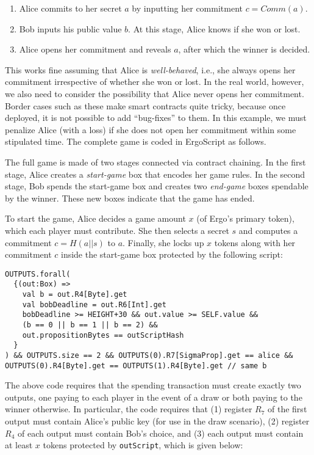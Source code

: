 \documentclass[runningheads]{llncs}
\newcommand{\langname}{ErgoScript\xspace}
\begin{document}
\begin{enumerate}
	\item Alice commits to her secret $a$ by inputting her commitment $c = Comm(a)$.
	\item Bob inputs his public value $b$. At this stage, Alice knows if she won or lost.
	\item Alice opens her commitment and reveals $a$, after which the winner is decided.
\end{enumerate}


This works fine assuming that Alice is {\em well-behaved}, i.e., she always opens her commitment irrespective of whether she won or lost. In the real world, however, we also need to consider the possibility that Alice never opens her commitment. 
Border cases such as these make smart contracts quite tricky, because once deployed, it is not possible to add ``bug-fixes'' to them. In this example, we must penalize Alice (with a loss) if she does not open her commitment within some stipulated time.
The complete game is coded in \langname as follows.

The full game is made of two stages connected via contract chaining. In the first stage, Alice creates a {\em start-game} box that encodes her game rules. In the second stage, Bob spends the start-game box and creates two {\em end-game} boxes spendable by the winner. These new boxes indicate that the game has ended.

To start the game, Alice decides a game amount $x$ (of Ergo's primary token), which each player must contribute. She then selects a secret $s$ and computes a commitment $c=H(a||s)$ to $a$. Finally, she locks up $x$ tokens along with her commitment $c$ inside the start-game box protected by the following script:
\small{
	\begin{verbatim}
OUTPUTS.forall(
  {(out:Box) =>
    val b = out.R4[Byte].get
    val bobDeadline = out.R6[Int].get
    bobDeadline >= HEIGHT+30 && out.value >= SELF.value &&
    (b == 0 || b == 1 || b == 2) && 
    out.propositionBytes == outScriptHash
  }
) && OUTPUTS.size == 2 && OUTPUTS(0).R7[SigmaProp].get == alice &&
OUTPUTS(0).R4[Byte].get == OUTPUTS(1).R4[Byte].get // same b
	\end{verbatim}
}


The above code requires that the spending transaction must create exactly two outputs, one paying to each player in the event of a draw or both paying to the winner otherwise. In particular, the code requires that (1) register $R_7$ of the first output must contain Alice's public key (for use in the draw scenario), (2) register $R_4$ of each output must contain Bob's choice, and (3) each output must contain at least $x$ tokens protected by \texttt{outScript}, which is given below:
\end{document}
